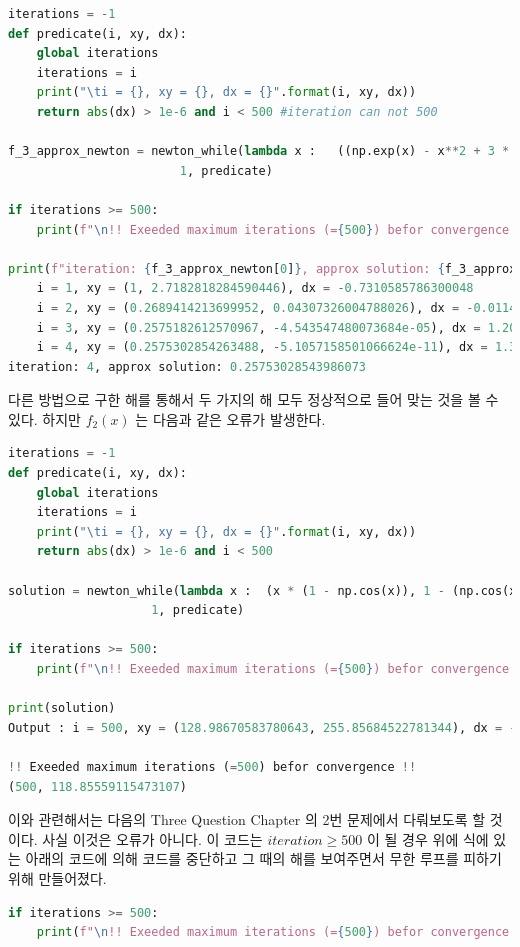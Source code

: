 \documentclass[11pt]{article}
\begin{document}
\begin{lstlisting}[language=Python]
iterations = -1
def predicate(i, xy, dx):
    global iterations
    iterations = i
    print("\ti = {}, xy = {}, dx = {}".format(i, xy, dx))
    return abs(dx) > 1e-6 and i < 500 #iteration can not 500

f_3_approx_newton = newton_while(lambda x :   ((np.exp(x) - x**2 + 3 * x - 2), np.exp(x) - 2 * x + 3), 
                        1, predicate)

if iterations >= 500:
    print(f"\n!! Exeeded maximum iterations (={500}) befor convergence !!")
    
print(f"iteration: {f_3_approx_newton[0]}, approx solution: {f_3_approx_newton[1]}")
	i = 1, xy = (1, 2.7182818284590446), dx = -0.7310585786300048
	i = 2, xy = (0.2689414213699952, 0.04307326004788026), dx = -0.011423160112898526
	i = 3, xy = (0.2575182612570967, -4.543547480073684e-05), dx = 1.2024169252108878e-05
	i = 4, xy = (0.2575302854263488, -5.1057158501066624e-11), dx = 1.3511937484935972e-11
iteration: 4, approx solution: 0.25753028543986073
\end{lstlisting}

\noindent  
다른 방법으로 구한 해를 통해서 두 가지의 해 모두 정상적으로 들어 맞는 것을 볼 수 있다. 하지만 $f_2(x)$ 는 다음과 같은 오류가 발생한다. 

\begin{lstlisting}[language=Python]
iterations = -1
def predicate(i, xy, dx):
    global iterations
    iterations = i
    print("\ti = {}, xy = {}, dx = {}".format(i, xy, dx))
    return abs(dx) > 1e-6 and i < 500 

solution = newton_while(lambda x :  (x * (1 - np.cos(x)), 1 - (np.cos(x) + x * np.sin(x))), 
                    1, predicate)

if iterations >= 500:
    print(f"\n!! Exeeded maximum iterations (={500}) befor convergence !!")
    
print(solution) 
Output : i = 500, xy = (128.98670583780643, 255.85684522781344), dx = -10.131114683075353

!! Exeeded maximum iterations (=500) befor convergence !!
(500, 118.85559115473107)
\end{lstlisting}

\noindent  
이와 관련해서는 다음의 Three Question Chapter 의 2번 문제에서 다뤄보도록 할 것이다. 사실 이것은 오류가 아니다. 이 코드는 $iteration \geq 500$ 이 될 경우 위에 식에 있는 아래의 코드에 의해 코드를 중단하고 그 때의 해를 보여주면서 무한 루프를 피하기 위해 만들어졌다.
\begin{lstlisting}[language=Python]
if iterations >= 500:
    print(f"\n!! Exeeded maximum iterations (={500}) befor convergence !!")
\end{lstlisting}
\end{document}
